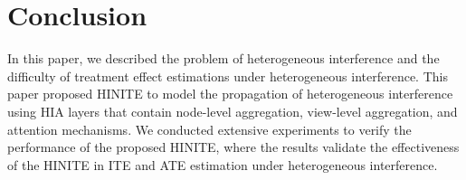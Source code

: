 \documentclass[runningheads]{llncs}
\begin{document}
\section{Conclusion}

In this paper, we described the problem of heterogeneous interference and the difficulty of treatment effect estimations under heterogeneous interference. This paper proposed HINITE to model the propagation of heterogeneous interference using HIA layers that contain node-level aggregation, view-level aggregation, and attention mechanisms. We conducted extensive experiments to verify the performance of the proposed HINITE, where the results validate the effectiveness of the HINITE in ITE and ATE estimation under heterogeneous interference.






\end{document}
